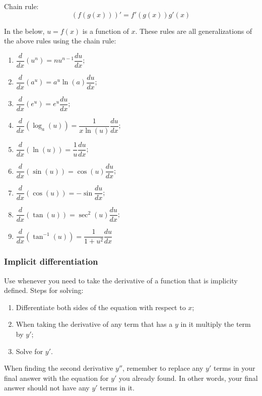 \begin{note}{}{}
    Chain rule:
    \useshortskip
    \[
        \left(f\left(g(x)\right)\right)' = f'\left(g(x)\right)g'(x)  
    \]
    \par 
    In the below, $u = f(x)$ is a function of $x$. These rules are all generalizations of the above rules using the chain rule:
    \begin{enumerate}
        \item $\dfrac{d}{dx}\left(u^n\right) = nu^{n-1}\dfrac{du}{dx}$;
        \item $\dfrac{d}{dx}\left(a^u\right) = a^u \ln(a) \dfrac{du}{dx}$;
        \item $\dfrac{d}{dx}\left(e^u\right) = e^u \dfrac{du}{dx}$;
        \item $\dfrac{d}{dx}\left(\log_a(u)\right) = \dfrac{1}{x\ln(u)}\dfrac{du}{dx}$;
        \item $\dfrac{d}{dx}\left(\ln (u)\right) = \dfrac{1}{u}\dfrac{du}{dx}$;
        \item $\dfrac{d}{dx}\left(\sin(u)\right) = \cos(u) \dfrac{du}{dx}$;
        \item $\dfrac{d}{dx} \left(\cos(u)\right) = -\sin\dfrac{du}{dx}$;
        \item $\dfrac{d}{dx} \left(\tan(u)\right) = \sec^2(u)\dfrac{du}{dx}$;
        \item $\dfrac{d}{dx}\left(\tan^{-1}(u)\right) = \dfrac{1}{1+u^2} \dfrac{du}{dx}$
    \end{enumerate}
\end{note}

\subsubsection*{Implicit differentiation}
\par 
Use whenever you need to take the derivative of a function that is implicity defined. Steps for solving:
\begin{enumerate}
    \item Differentiate both sides of the equation with respect to $x$;
    \item When taking the derivative of any term that has a $y$ in it multiply the term by $y'$;
    \item Solve for $y'$.
\end{enumerate}
When finding the second derivative $y''$, remember to replace any $y'$ terms in your final answer with the equation for $y'$ you already found. In other words, your final answer should not have any $y'$ terms in it.

